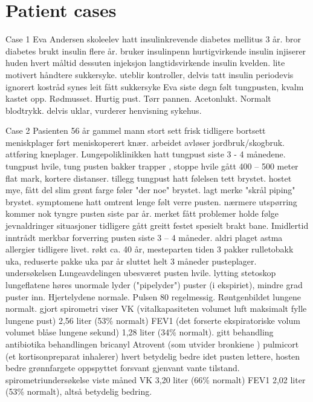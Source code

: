 \chapter{Patient cases}

Case 1
Eva Andersen skoleelev hatt insulinkrevende diabetes mellitus 3 år.
bror diabetes brukt insulin flere år.
bruker insulinpenn hurtigvirkende insulin injiserer huden hvert måltid dessuten injeksjon langtidsvirkende insulin kvelden.
lite motivert håndtere sukkersyke.
uteblir kontroller, delvis tatt insulin periodevis ignorert kostråd
synes leit fått sukkersyke
Eva siste døgn følt tungpusten, kvalm kastet opp.
Rødmusset.
Hurtig pust.
Tørr pannen.
Acetonlukt.
Normalt blodtrykk.
delvis uklar, vurderer henvisning sykehus.

Case 2
Pasienten 56 år gammel mann stort sett frisk tidligere bortsett meniskplager ført meniskoperert knær.
arbeidet avløser jordbruk/skogbruk.
attføring kneplager.
Lungepoliklinikken hatt tungpust siste 3 - 4 månedene.
tungpust hvile, tung pusten bakker trapper , stoppe hvile gått 400 -- 500 meter flat mark, kortere distanser.
tillegg tungpust hatt følelsen tett brystet.
hostet mye, fått del slim grønt farge føler "der noe" brystet.
lagt merke "skrål piping" brystet.
symptomene hatt omtrent lenge følt verre pusten.
nærmere utspørring kommer nok tyngre pusten siste par år.
merket fått problemer holde følge jevnaldringer situasjoner tidligere gått greitt festet spesielt brakt bane.
Imidlertid inntrådt merkbar forverring pusten siste 3 -- 4 måneder.
aldri plaget astma allergier tidligere livet.
røkt ca.
40 år, mesteparten tiden 3 pakker rulletobakk uka, reduserte pakke uka par år sluttet helt 3 måneder pusteplager.
undersøkelsen Lungeavdelingen ubesværet pusten hvile.
lytting stetoskop lungeflatene høres unormale lyder ("pipelyder") puster (i ekspiriet), mindre grad puster inn.
Hjertelydene normale.
Pulsen 80 regelmessig.
Røntgenbildet lungene normalt.
gjort spirometri viser VK (vitalkapasiteten volumet luft maksimalt fylle lungene pust) 2,56 liter (53\% normalt) FEV1 (det forserte ekspiratoriske volum volumet blåse lungene sekund) 1,28 liter (34\% normalt).
gitt behandling antibiotika behandlingen bricanyl Atrovent (som utvider bronkiene ) pulmicort (et kortisonpreparat inhalerer) hvert betydelig bedre idet pusten lettere, hosten bedre grønnfargete oppspyttet forsvant gjenvant vante tilstand.
spirometriundersøkelse viste måned VK 3,20 liter (66\% normalt) FEV1 2,02 liter (53\% normalt), altså betydelig bedring.

